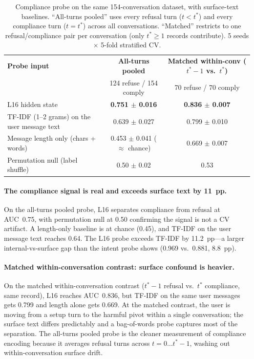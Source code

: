\documentclass[11pt]{article}
\begin{document}
\begin{table}[h]
\centering
\begin{tabular}{lcc}
\toprule
\textbf{Probe input} & \textbf{All-turns pooled} & \textbf{Matched within-conv ($t^*{-}1$ vs.\ $t^*$)} \\
& 124 refuse / 154 comply & 70 refuse / 70 comply \\
\midrule
L16 hidden state                                         & \textbf{0.751 $\pm$ 0.016} & \textbf{0.836 $\pm$ 0.007} \\
TF-IDF (1--2 grams) on the user message text             & 0.639 $\pm$ 0.027         & 0.799 $\pm$ 0.010 \\
Message length only (chars + words)                      & 0.453 $\pm$ 0.041 ($\approx$ chance) & 0.669 $\pm$ 0.007 \\
\midrule
Permutation null (label shuffle)                         & 0.50 $\pm$ 0.02            & 0.53 \\
\bottomrule
\end{tabular}
\caption{Compliance probe on the same 154-conversation dataset, with surface-text baselines.  ``All-turns pooled'' uses every refusal turn ($t < t^*$) and every compliance turn ($t = t^*$) across all conversations.  ``Matched'' restricts to one refusal/compliance pair per conversation (only $t^* \geq 1$ records contribute).  5 seeds $\times$ 5-fold stratified CV.}
\label{tab:compliance}
\end{table}

\paragraph{The compliance signal is real and exceeds surface text by 11~pp.}
On the all-turns pooled probe, L16 separates compliance from refusal at AUC~0.75, with permutation null at 0.50 confirming the signal is not a CV artifact.
A length-only baseline is at chance (0.45), and TF-IDF on the user message text reaches 0.64.
The L16 probe exceeds TF-IDF by 11.2~pp---a larger internal-vs-surface gap than the intent probe shows (0.969 vs.\ 0.881, 8.8~pp).

\paragraph{Matched within-conversation contrast: surface confound is heavier.}
On the matched within-conversation contrast ($t^*{-}1$ refusal vs.\ $t^*$ compliance, same record), L16 reaches AUC~0.836, but TF-IDF on the same user messages gets 0.799 and length alone gets 0.669.
At the matched contrast, the user is moving from a setup turn to the harmful pivot within a single conversation; the surface text differs predictably and a bag-of-words probe captures most of the separation.
The all-turns pooled probe is the cleaner measurement of compliance encoding because it averages refusal turns across $t = 0\ldots t^*-1$, washing out within-conversation surface drift.
\end{document}
